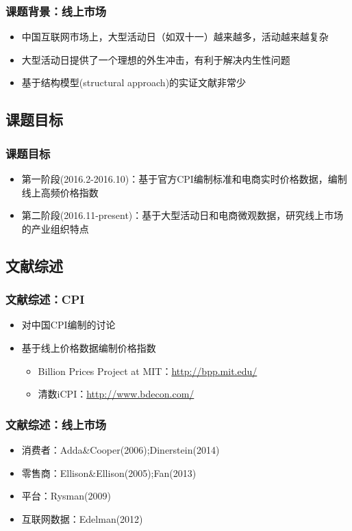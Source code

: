 \documentclass{beamer}
\begin{document}
\begin{frame}
\frametitle{课题背景：线上市场}
\begin{itemize}
  \item 中国互联网市场上，大型活动日（如双十一）越来越多，活动越来越复杂
  \item 大型活动日提供了一个理想的外生冲击，有利于解决内生性问题
  \item 基于结构模型(structural approach)的实证文献非常少
\end{itemize}
\end{frame}

\subsection{课题目标}
\begin{frame}
\frametitle{课题目标}
\begin{itemize}
  \item 第一阶段(2016.2-2016.10)：基于官方CPI编制标准和电商实时价格数据，编制线上高频价格指数
  \item 第二阶段(2016.11-present)：基于大型活动日和电商微观数据，研究线上市场的产业组织特点
\end{itemize}
\end{frame}

\subsection{文献综述}
\begin{frame}
\frametitle{文献综述：CPI}
\begin{itemize}
  \item 对中国CPI编制的讨论
  \item 基于线上价格数据编制价格指数
  \begin{itemize}
    \item Billion Prices Project at MIT：\url{http://bpp.mit.edu/}
    \item 清数iCPI：\url{http://www.bdecon.com/}
  \end{itemize}
\end{itemize}
\end{frame}

\begin{frame}
\frametitle{文献综述：线上市场}
\begin{itemize}
  \item 消费者：Adda\&Cooper(2006);Dinerstein(2014)
  \item 零售商：Ellison\&Ellison(2005);Fan(2013)
  \item 平台：Rysman(2009)
  \item 互联网数据：Edelman(2012)
\end{itemize}
\end{frame}
\end{document}
